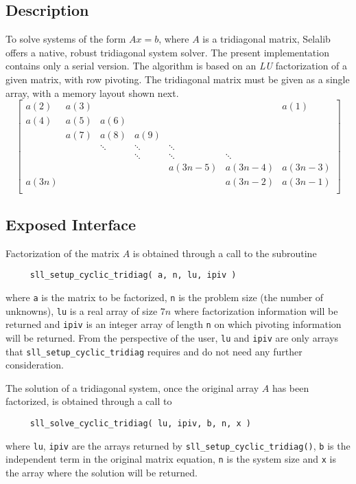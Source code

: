 \documentclass[]{report}   %
\begin{document}
\subsection{Description}
To solve systems of the form $Ax=b$, where $A$ is a tridiagonal matrix, Selalib offers a native, robust tridiagonal system solver. The present implementation contains only a serial version. The algorithm is based on an \emph{LU} factorization of a given matrix, with row pivoting. The tridiagonal matrix must be given as a single array, with a memory layout shown next.
\begin{equation*}
  \begin{bmatrix}
    a(2) & a(3) &        &        &        &        &  a(1) \\
    a(4) & a(5) & a(6)   &        &        &        &       \\
         & a(7) & a(8)   & a(9)   &        &        &       \\
         &      & \ddots & \ddots & \ddots &        &       \\
         &      &        & \ddots & \ddots & \ddots &       \\
         &      &        &        & a(3n-5)& a(3n-4)&a(3n-3)\\
    a(3n)&      &        &        &        & a(3n-2)&a(3n-1)\\
  \end{bmatrix}
\end{equation*}

\subsection{Exposed Interface}
Factorization of the matrix $A$ is obtained through a call to the subroutine
\begin{verbatim}
     sll_setup_cyclic_tridiag( a, n, lu, ipiv )
\end{verbatim}
where \verb+a+ is the matrix to be factorized, \verb+n+ is the problem size (the number of unknowns), \verb+lu+ is a real array of size $7n$ where factorization information will be returned and \verb+ipiv+ is an integer array of length \verb+n+ on which pivoting information will be returned. From the perspective of the user, \verb+lu+ and \verb+ipiv+ are only arrays that \verb+sll_setup_cyclic_tridiag+ requires and do not need any further consideration.

The solution of a tridiagonal system, once the original array $A$ has been factorized, is obtained through a call to 
\begin{verbatim}
     sll_solve_cyclic_tridiag( lu, ipiv, b, n, x )
\end{verbatim}
where \verb+lu+, \verb+ipiv+ are the arrays returned by \verb+sll_setup_cyclic_tridiag()+, \verb+b+ is the independent term in the original matrix equation, \verb+n+ is the system size and \verb+x+ is the array where the solution will be returned.
  
\end{document}
